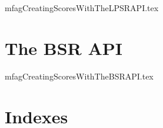 \documentclass[11pt,a4paper]{report}
\begin{document}
{mfagCreatingScoresWithTheLPSRAPI.tex}


\part{The BSR API}


{mfagCreatingScoresWithTheBSRAPI.tex}



\part{Indexes}

\useListsPagesHeadersAndFooters

\printindex[Files]

\printindex[Options]

\printindex[MusicXML]

\printindex[Main]


\end{document}
